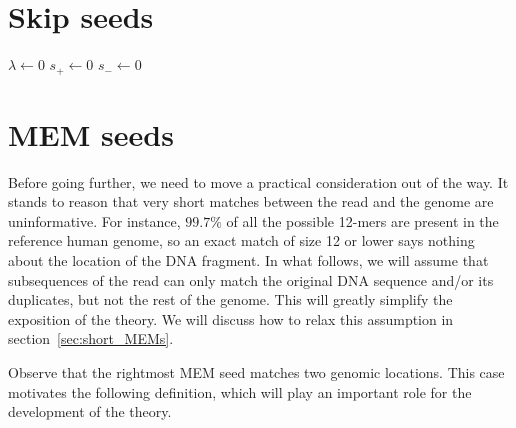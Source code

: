 \documentclass{article}
\begin{document}
\section{Skip seeds}


\begin{algorithm}[H]
\label{alg:mcmcskip}
\SetAlgoLined
{}
  $\lambda \leftarrow 0$ 
  $s_+ \leftarrow 0$ 
  $s_- \leftarrow 0$ 
\end{algorithm}

\section{MEM seeds}

Before going further, we need to move a practical consideration out of the
way. It stands to reason that very short matches between the read and the
genome are uninformative. For instance, $99.7\%$ of all the possible
12-mers are present in the reference human genome, so an exact match of
size 12 or lower says nothing about the location of the DNA fragment. In
what follows, we will assume that subsequences of the read can only match
the original DNA sequence and/or its duplicates, but not the rest of the
genome. This will greatly simplify the exposition of the theory. We will
discuss how to relax this assumption in section~\ref{sec:short_MEMs}.

Observe that the rightmost MEM seed matches two genomic locations. This
case motivates the following definition, which will play an important role
for the development of the theory.
\end{document}

